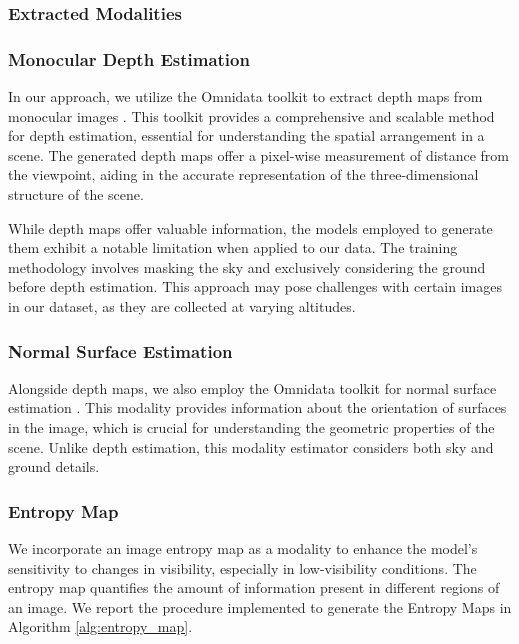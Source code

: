 \subsubsection{Extracted Modalities}
\label{modalities}
\subsubsection{Monocular Depth Estimation}
In our approach, we utilize the Omnidata toolkit to extract depth maps from monocular images \cite{eftekhar2021omnidata}. This toolkit provides a comprehensive and scalable method for depth estimation, essential for understanding the spatial arrangement in a scene. The generated depth maps offer a pixel-wise measurement of distance from the viewpoint, aiding in the accurate representation of the three-dimensional structure of the scene. 


While depth maps offer valuable information, the models employed to generate them exhibit a notable limitation when applied to our data. The training methodology involves masking the sky and exclusively considering the ground before depth estimation. This approach may pose challenges with certain images in our dataset, as they are collected at varying altitudes.

\subsubsection{Normal Surface Estimation}
Alongside depth maps, we also employ the Omnidata toolkit for normal surface estimation \cite{eftekhar2021omnidata}. This modality provides information about the orientation of surfaces in the image, which is crucial for understanding the geometric properties of the scene. Unlike depth estimation, this modality estimator considers both sky and ground details.


\subsubsection{Entropy Map}
We incorporate an image entropy map as a modality to enhance the model's sensitivity to changes in visibility, especially in low-visibility conditions. The entropy map quantifies the amount of information present in different regions of an image. We report the procedure implemented to generate the Entropy Maps in Algorithm \ref{alg:entropy_map}.


